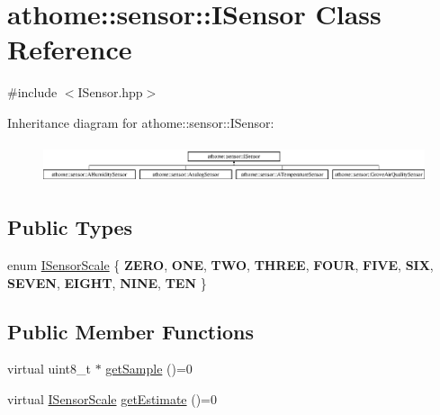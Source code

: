 \hypertarget{classathome_1_1sensor_1_1_i_sensor}{}\section{athome\+:\+:sensor\+:\+:I\+Sensor Class Reference}
\label{classathome_1_1sensor_1_1_i_sensor}


{\ttfamily \#include $<$I\+Sensor.\+hpp$>$}

Inheritance diagram for athome\+:\+:sensor\+:\+:I\+Sensor\+:\begin{figure}[H]
\begin{center}
\leavevmode
\includegraphics[height=1.157025cm]{classathome_1_1sensor_1_1_i_sensor}
\end{center}
\end{figure}
\subsection*{Public Types}
\begin{DoxyCompactItemize}
\item 
enum \mbox{\hyperlink{classathome_1_1sensor_1_1_i_sensor_aa70bc27a4c17c86caf96cca776541ddf}{I\+Sensor\+Scale}} \{ \newline
{\bfseries Z\+E\+RO}, 
{\bfseries O\+NE}, 
{\bfseries T\+WO}, 
{\bfseries T\+H\+R\+EE}, 
\newline
{\bfseries F\+O\+UR}, 
{\bfseries F\+I\+VE}, 
{\bfseries S\+IX}, 
{\bfseries S\+E\+V\+EN}, 
\newline
{\bfseries E\+I\+G\+HT}, 
{\bfseries N\+I\+NE}, 
{\bfseries T\+EN}
 \}
\end{DoxyCompactItemize}
\subsection*{Public Member Functions}
\begin{DoxyCompactItemize}
\item 
virtual uint8\+\_\+t $\ast$ \mbox{\hyperlink{classathome_1_1sensor_1_1_i_sensor_a2513fd8acc5d8251439330ca0e78cf04}{get\+Sample}} ()=0
\item 
virtual \mbox{\hyperlink{classathome_1_1sensor_1_1_i_sensor_aa70bc27a4c17c86caf96cca776541ddf}{I\+Sensor\+Scale}} \mbox{\hyperlink{classathome_1_1sensor_1_1_i_sensor_a95785b54ffe3a8f7e48c81b5732e3b9f}{get\+Estimate}} ()=0
\end{DoxyCompactItemize}


